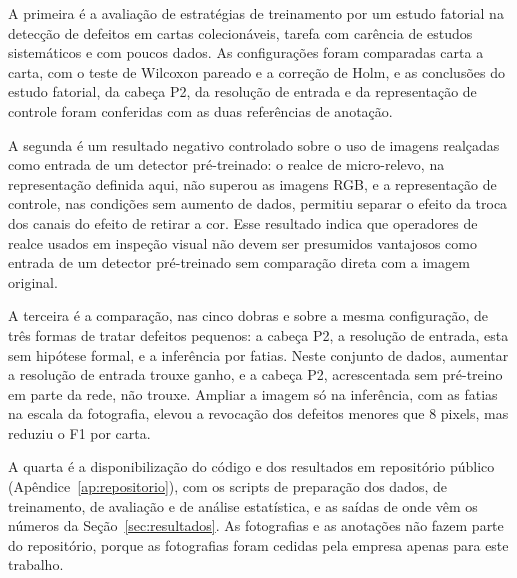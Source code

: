 \documentclass[
    12pt,                %
    openright,           %
    oneside,             %
    a4paper,             %
    english,             %
    brazil               %
]{abntex2}
\begin{document}
A primeira é a avaliação de estratégias de treinamento por um estudo
fatorial na detecção de defeitos em cartas colecionáveis, tarefa com
carência de estudos sistemáticos e com poucos dados. As configurações
foram comparadas carta a carta, com o teste de Wilcoxon pareado e a
correção de Holm, e as conclusões do estudo fatorial, da cabeça P2, da
resolução de entrada e da representação de controle foram conferidas
com as duas referências de anotação.

A segunda é um resultado negativo controlado sobre o uso de imagens
realçadas como entrada de um detector pré-treinado: o realce de
micro-relevo, na representação definida aqui, não superou as imagens
RGB, e a representação de controle, nas condições sem aumento de dados,
permitiu separar o efeito da troca
dos canais do efeito de retirar a cor. Esse resultado indica que
operadores de realce usados em inspeção visual não devem ser presumidos
vantajosos como entrada de um detector pré-treinado sem comparação
direta com a imagem original.

A terceira é a comparação, nas cinco dobras e sobre a mesma
configuração, de três formas de tratar defeitos pequenos: a cabeça P2, a
resolução de entrada, esta sem hipótese formal, e a inferência por
fatias. Neste conjunto de dados, aumentar a resolução de entrada trouxe
ganho, e a cabeça P2, acrescentada sem pré-treino em parte da rede, não
trouxe. Ampliar a imagem só na inferência, com as fatias na escala da
fotografia, elevou a revocação dos defeitos menores que 8 pixels, mas
reduziu o F1 por carta.

A quarta é a disponibilização do código e dos resultados em repositório
público (Apêndice~\ref{ap:repositorio}), com os scripts de preparação
dos dados, de treinamento, de avaliação e de análise estatística, e as
saídas de onde vêm os números da Seção~\ref{sec:resultados}. As
fotografias e as anotações não fazem parte do repositório, porque as
fotografias foram cedidas pela empresa apenas para este trabalho.
\end{document}
